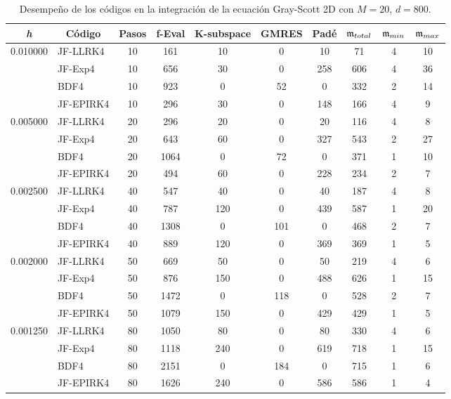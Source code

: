 \begin{table}[htb]
	\caption{Desempeño de los códigos en la integración de la ecuación Gray-Scott 2D con $M=20$, $d=800$.}
	\centering
	\begin{adjustbox}{width=0.9\columnwidth,center}
		\begin{tabular}{cccccccccc}
			\hline
			\textit{h} & Código & Pasos & f-Eval & K-subspace & GMRES & Padé & $\mathfrak{m}_{total}$ & $\mf%
			_{min}$ & $\mathfrak{m}_{max}$ \\ \hline
			0.010000 & \multicolumn{1}{l}{JF-LLRK4} & 10 & 161 & 10 & 0 & 10 & 71 & 4 &
			10 \\
			& \multicolumn{1}{l}{JF-Exp4} & 10 & 656 & 30 & 0 & 258 & 606 & 4 & 36 \\
			& \multicolumn{1}{l}{BDF4} & 10 & 923 & 0 & 52 & 0 & 332 & 2 & 14 \\
			& \multicolumn{1}{l}{JF-EPIRK4} & 10 & 296 & 30 & 0 & 148 & 166 & 4 & 9 \\
			0.005000 & \multicolumn{1}{l}{JF-LLRK4} & 20 & 296 & 20 & 0 & 20 & 116 & 4 &
			8 \\
			& \multicolumn{1}{l}{JF-Exp4} & 20 & 643 & 60 & 0 & 327 & 543 & 2 & 27 \\
			& \multicolumn{1}{l}{BDF4} & 20 & 1064 & 0 & 72 & 0 & 371 & 1 & 10 \\
			& \multicolumn{1}{l}{JF-EPIRK4} & 20 & 494 & 60 & 0 & 228 & 234 & 2 & 7 \\
			0.002500 & \multicolumn{1}{l}{JF-LLRK4} & 40 & 547 & 40 & 0 & 40 & 187 & 4 &
			8 \\
			& \multicolumn{1}{l}{JF-Exp4} & 40 & 787 & 120 & 0 & 439 & 587 & 1 & 20 \\
			& \multicolumn{1}{l}{BDF4} & 40 & 1308 & 0 & 101 & 0 & 468 & 2 & 7 \\
			& \multicolumn{1}{l}{JF-EPIRK4} & 40 & 889 & 120 & 0 & 369 & 369 & 1 & 5 \\
			0.002000 & \multicolumn{1}{l}{JF-LLRK4} & 50 & 669 & 50 & 0 & 50 & 219 & 4 &
			6 \\
			& \multicolumn{1}{l}{JF-Exp4} & 50 & 876 & 150 & 0 & 488 & 626 & 1 & 15 \\
			& \multicolumn{1}{l}{BDF4} & 50 & 1472 & 0 & 118 & 0 & 528 & 2 & 7 \\
			& \multicolumn{1}{l}{JF-EPIRK4} & 50 & 1079 & 150 & 0 & 429 & 429 & 1 & 5 \\
			0.001250 & \multicolumn{1}{l}{JF-LLRK4} & 80 & 1050 & 80 & 0 & 80 & 330 & 4
			& 6 \\
			& \multicolumn{1}{l}{JF-Exp4} & 80 & 1118 & 240 & 0 & 619 & 718 & 1 & 15 \\
			& \multicolumn{1}{l}{BDF4} & 80 & 2151 & 0 & 184 & 0 & 715 & 1 & 6 \\
			& \multicolumn{1}{l}{JF-EPIRK4} & 80 & 1626 & 240 & 0 & 586 & 586 & 1 & 4 \\
			\hline
		\end{tabular}
	\end{adjustbox}
	\label{tab:gs2d}
\end{table}



